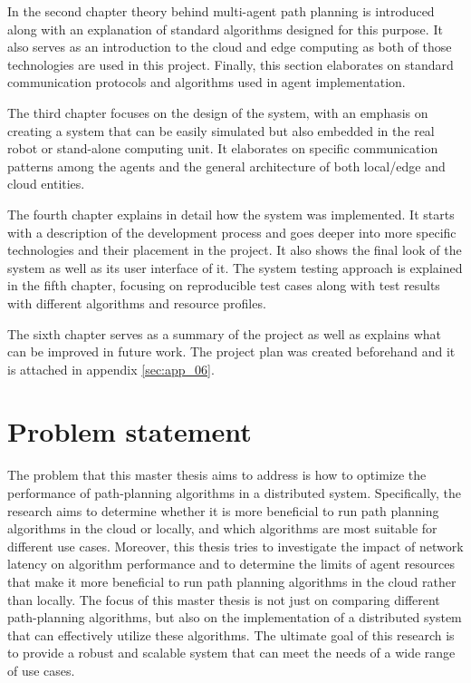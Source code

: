 In the second chapter theory behind multi-agent path planning is introduced along with an explanation of standard algorithms designed for this purpose. It also serves as an introduction to the cloud and edge computing as both of those technologies are used in this project. Finally, this section elaborates on standard communication protocols and algorithms used in agent implementation.

The third chapter focuses on the design of the system, with an emphasis on creating a system that can be easily simulated but also embedded in the real robot or stand-alone computing unit. It elaborates on specific communication patterns among the agents and the general architecture of both local/edge and cloud entities.

The fourth chapter explains in detail how the system was implemented. It starts with a description of the development process and goes deeper into more specific technologies and their placement in the project. It also shows the final look of the system as well as its user interface of it. The system testing approach is explained in the fifth chapter, focusing on reproducible test cases along with test results with different algorithms and resource profiles.

The sixth chapter serves as a summary of the project as well as explains what can be improved in future work. The project plan was created beforehand and it is attached in appendix \ref{sec:app_06}. 

\section{Problem statement}
The problem that this master thesis aims to address is how to optimize the performance of path-planning algorithms in a distributed system. Specifically, the research aims to determine whether it is more beneficial to run path planning algorithms in the cloud or locally, and which algorithms are most suitable for different use cases. Moreover, this thesis tries to investigate the impact of network latency on algorithm performance and to determine the limits of agent resources that make it more beneficial to run path planning algorithms in the cloud rather than locally. The focus of this master thesis is not just on comparing different path-planning algorithms, but also on the implementation of a distributed system that can effectively utilize these algorithms. The ultimate goal of this research is to provide a robust and scalable system that can meet the needs of a wide range of use cases.

